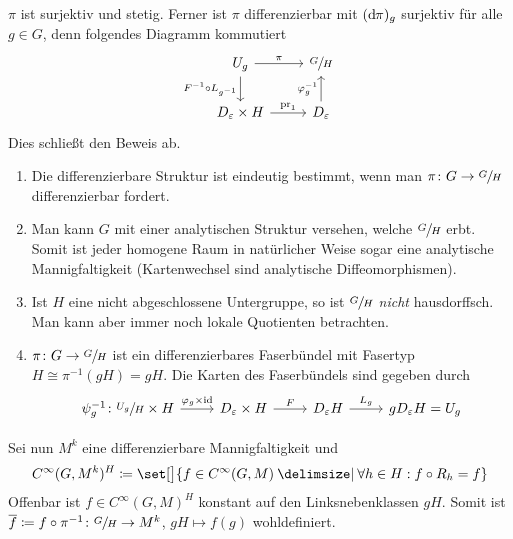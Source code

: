 \begin{beweis}
\begin{enumerate}[(i)]
		$\pi$ ist surjektiv und stetig. Ferner ist $\pi$ differenzierbar mit $(\mathrm{d}\mkern-1.0mu \pi)_g$ surjektiv für alle $g \in G$, denn folgendes Diagramm kommutiert
		\[
			\begin{tikzcd}
				U_g \dar["F^{-1} \circ L_{g^{-1}}"'] \rar["\pi"] & \sfrac{G}{H} \\
				D_\varepsilon \times H \rar["\pr_1"] & D_\varepsilon \uar["\varphi_g^{-1}"]
			\end{tikzcd}
		\]
		Dies schließt den Beweis ab.\qedhere
	\end{enumerate}
\end{beweis}

\begin{bemerkung*}[{name=[differenzierbare Struktur des Quotienten]}]
	\begin{enumerate}[1),itemsep=1pt]
		\item Die differenzierbare Struktur ist eindeutig bestimmt, wenn man $\pi \colon G \to \sfrac{G}{H}$ differenzierbar fordert.
		\item Man kann $G$ mit einer analytischen Struktur versehen, welche $\sfrac{G}{H}$ erbt.
		Somit ist jeder homogene Raum in natürlicher Weise sogar eine analytische Mannigfaltigkeit (Kartenwechsel sind analytische Diffeomorphismen).
		\item Ist $H$ eine nicht abgeschlossene Untergruppe, so ist $\sfrac{G}{H}$ \emph{nicht} hausdorffsch.
		Man kann aber immer noch lokale Quotienten betrachten.
		\item $\pi \colon G \to \sfrac{G}{H}$ ist ein differenzierbares Faserbündel mit Fasertyp $H \cong \pi^{-1}(gH) = gH$.
		Die Karten des Faserbündels sind gegeben durch
		\[
			\begin{tikzcd}
				\psi_g^{-1} \colon \sfrac{U_g}{H} \times H \rar["\varphi_g \times {\id}"] & D_\varepsilon \times H \rar["F"] & D_\varepsilon H \rar["L_g"] & g D_\varepsilon H = U_g
			\end{tikzcd}
		\]
	\end{enumerate}
\end{bemerkung*}

Sei nun $M^k$ eine differenzierbare Mannigfaltigkeit und 
\[
	C^\infty(G,M^k)^H \coloneqq \set[\big]{f \in C^\infty(G,M) \given \forall h \in H : f \circ R_h = f}
\]
Offenbar ist $f \in C^\infty(G,M)^H$ konstant auf den Linksnebenklassen $g H$.
Somit ist $\overline{f} \coloneqq f \circ \pi^{-1} \colon \sfrac{G}{H} \to M^k$, $gH \mapsto f(g)$ wohldefiniert.

